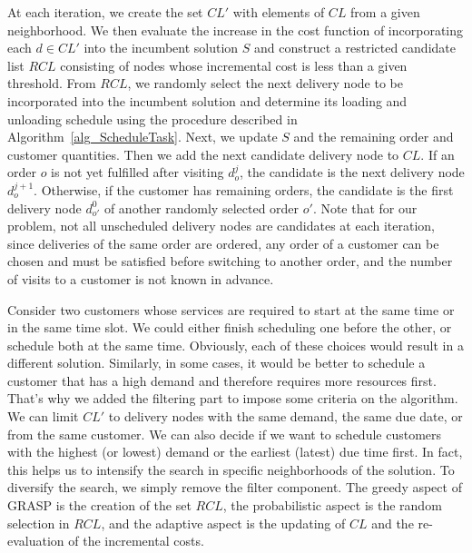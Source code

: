 \documentclass{article}
\begin{document}
At each iteration, we create the set $CL'$ with elements of $CL$ from a given neighborhood. We then evaluate the increase in the cost function of incorporating each $d \in CL'$ into the incumbent solution $S$ and construct a restricted candidate list $RCL$ consisting of nodes whose incremental cost is less than a given threshold. From $RCL$, we randomly select the next delivery node to be incorporated into the incumbent solution and determine its loading and unloading schedule using the procedure described in Algorithm~\ref{alg_ScheduleTask}. Next, we update $S$ and the remaining order and customer quantities. Then we add the next candidate delivery node to $CL$. If an order $o$ is not yet fulfilled after visiting $d^j_{o}$, the candidate is the next delivery node $d^{j+1}_{o}$. Otherwise, if the customer has remaining orders, the candidate is the first delivery node $d^{0}_{o'}$ of another randomly selected order $o'$. Note that for our problem, not all unscheduled delivery nodes are candidates at each iteration, since deliveries of the same order are ordered, any order of a customer can be chosen and must be satisfied before switching to another order, and the number of visits to a customer is not known in advance. 

Consider two customers whose services are required to start at the same time or in the same time slot. We could either finish scheduling one before the other, or schedule both at the same time. Obviously, each of these choices would result in a different solution. Similarly, in some cases, it would be better to schedule a customer that has a high demand and therefore requires more resources first. That's why we added the filtering part to impose some criteria on the algorithm. We can limit $CL'$ to delivery nodes with the same demand, the same due date, or from the same customer. We can also decide if we want to schedule customers with the highest (or lowest) demand or the earliest (latest) due time first. In fact, this helps us to intensify the search in specific neighborhoods of the solution. To diversify the search, we simply remove the filter component. The greedy aspect of GRASP is the creation of the set $RCL$, the probabilistic aspect is the random selection in $RCL$, and the adaptive aspect is the updating of $CL$ and the re-evaluation of the incremental costs. 

\end{document}
